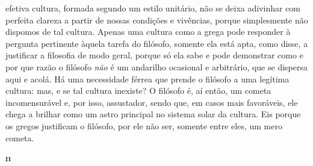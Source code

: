 efetiva cultura, formada segundo um estilo unitário, não
se deixa adivinhar com perfeita clareza a partir de nossas condições e
vivências, porque simplesmente não dispomos de tal cultura. Apenas uma
cultura como a grega pode responder à pergunta pertinente àquela tarefa do
filósofo, somente ela está apta, como disse, a justificar a filosofia de modo
geral, porque só ela sabe e pode demonstrar como e por que razão o
filósofo \textit{não} é um andarilho ocasional e arbitrário, que se dispersa
aqui e acolá. Há uma necessidade férrea que prende o filósofo a uma legítima
cultura: mas, e se tal cultura inexiste? O filósofo é, aí então, um cometa
incomensurável e, por isso, assustador, sendo que, em casos mais favoráveis,
ele chega a brilhar como um astro principal no sistema solar da cultura. Eis
porque os gregos justificam o filósofo, por ele não ser, somente entre eles,
um mero cometa.

\bigskip
\textsc{\textbf{ii}}
\bigskip

